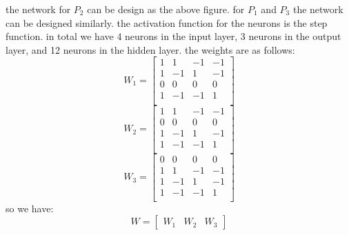 \begin{qsolve}
\begin{qsolve}[]
\begin{center}
\begin{tikzpicture}[shorten >=1pt,->,draw=black!50, node distance=2cm]
            \end{tikzpicture}
        \end{center}
        the network for $P_2$ can be design as the above figure. for $P_1$ and $P_3$ the network can be designed similarly. the activation function for the neurons is the step function. in total we have 4 neurons in the input layer, 3 neurons in the output layer, and 12 neurons in the hidden layer. the weights are as follows:
        $$W_1 = \begin{bmatrix}
            1 & 1 & -1 & -1\\
            1 & -1 & 1 & -1\\
            0 & 0 & 0 & 0\\
            1 & -1 & -1 & 1\\
        \end{bmatrix}$$
        \splitqsolve[\splitqsolve]
        $$W_2 = \begin{bmatrix}
            1 & 1 & -1 & -1\\
            0 & 0 & 0 & 0\\
            1 & -1 & 1 & -1\\
            1 & -1 & -1 & 1\\
        \end{bmatrix}$$
        $$W_3 = \begin{bmatrix}
            0 & 0 & 0 & 0\\
            1 & 1 & -1 & -1\\
            1 & -1 & 1 & -1\\
            1 & -1 & -1 & 1\\
        \end{bmatrix}$$
        so we have:
        $$W = \begin{bmatrix}
            W_1 & W_2 & W_3
        \end{bmatrix}$$
        

        
    \end{qsolve}
\end{qsolve}